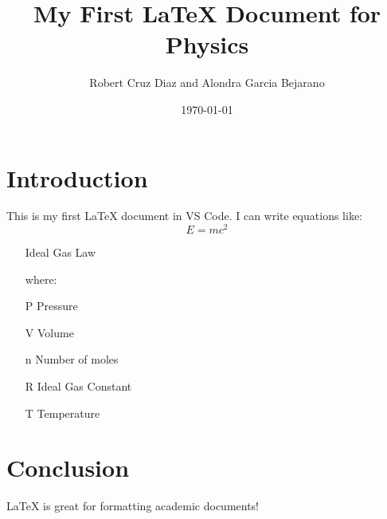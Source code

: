\documentclass{article}
\begin{document}
\title{My First LaTeX Document for Physics}
\author{Robert Cruz Diaz and Alondra Garcia Bejarano}
\date{\today}

\maketitle

\section{Introduction}
This is my first LaTeX document in VS Code. I can write equations like:
\[
    E = mc^2
\]


\begin{itemize}
    \item[Ideal Gas Law]
    \item[] where:
    \item[P] Pressure    
    \item[V] Volume
    \item[n] Number of moles
    \item[R] Ideal Gas Constant
    \item[T] Temperature
\end{itemize}





\section{Conclusion}
LaTeX is great for formatting academic documents!
\end{document}
